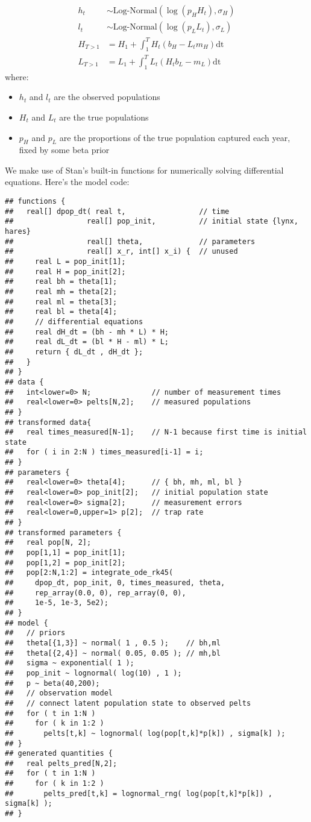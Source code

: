 \documentclass[
]{book}
\providecommand{\tightlist}{%
  \setlength{\itemsep}{0pt}\setlength{\parskip}{0pt}}
\begin{document}
\[
\begin{aligned}
h_{t} &\sim \text{Log-Normal}(\log(p_HH_t),\sigma_{H}) \\
l_{t} &\sim \text{Log-Normal}(\log(p_LL_t),\sigma_{L}) \\
H_{T>1} &= H_1 + \int^T_1 H_t(b_H - L_t m_H)\text{dt} \\
L_{T>1} &= L_1 + \int^T_1 L_t(H_t b_L - m_L)\text{dt}
\end{aligned}
\]
where:

\begin{itemize}
\tightlist
\item
  \(h_t\) and \(l_t\) are the observed populations
\item
  \(H_t\) and \(L_t\) are the true populations
\item
  \(p_H\) and \(p_L\) are the proportions of the true population captured each year, fixed by some beta prior
\end{itemize}

We make use of Stan's built-in functions for numerically solving differential equations. Here's the model code:

\begin{verbatim}
## functions {
##   real[] dpop_dt( real t,                 // time
##                 real[] pop_init,          // initial state {lynx, hares}
##                 real[] theta,             // parameters
##                 real[] x_r, int[] x_i) {  // unused
##     real L = pop_init[1];
##     real H = pop_init[2];
##     real bh = theta[1];
##     real mh = theta[2];
##     real ml = theta[3];
##     real bl = theta[4];
##     // differential equations
##     real dH_dt = (bh - mh * L) * H;
##     real dL_dt = (bl * H - ml) * L;
##     return { dL_dt , dH_dt };
##   }
## }
## data {
##   int<lower=0> N;              // number of measurement times
##   real<lower=0> pelts[N,2];    // measured populations
## }
## transformed data{
##   real times_measured[N-1];    // N-1 because first time is initial state
##   for ( i in 2:N ) times_measured[i-1] = i;
## }
## parameters {
##   real<lower=0> theta[4];      // { bh, mh, ml, bl }
##   real<lower=0> pop_init[2];   // initial population state
##   real<lower=0> sigma[2];      // measurement errors
##   real<lower=0,upper=1> p[2];  // trap rate
## }
## transformed parameters {
##   real pop[N, 2];
##   pop[1,1] = pop_init[1];
##   pop[1,2] = pop_init[2];
##   pop[2:N,1:2] = integrate_ode_rk45(
##     dpop_dt, pop_init, 0, times_measured, theta,
##     rep_array(0.0, 0), rep_array(0, 0),
##     1e-5, 1e-3, 5e2);
## }
## model {
##   // priors
##   theta[{1,3}] ~ normal( 1 , 0.5 );    // bh,ml
##   theta[{2,4}] ~ normal( 0.05, 0.05 ); // mh,bl
##   sigma ~ exponential( 1 );
##   pop_init ~ lognormal( log(10) , 1 );
##   p ~ beta(40,200);
##   // observation model
##   // connect latent population state to observed pelts
##   for ( t in 1:N )
##     for ( k in 1:2 )
##       pelts[t,k] ~ lognormal( log(pop[t,k]*p[k]) , sigma[k] );
## }
## generated quantities {
##   real pelts_pred[N,2];
##   for ( t in 1:N )
##     for ( k in 1:2 )
##       pelts_pred[t,k] = lognormal_rng( log(pop[t,k]*p[k]) , sigma[k] );
## }
\end{verbatim}
\end{document}
